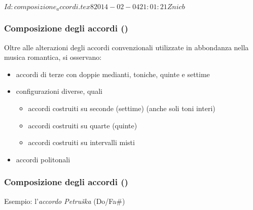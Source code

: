 %
%
\svnInfo $Id: composizione_accordi.tex 8 2014-02-04 21:01:21Z nicb $

\setcounter{ms}{0}
\begin{frame}
    \frametitle{Composizione degli accordi ()}
    
Oltre alle alterazioni degli accordi convenzionali
utilizzate in abbondanza nella musica romantica,
si osservano:

    \begin{itemize}

        \item accordi di terze con doppie medianti, toniche, quinte e settime

        \item configurazioni diverse, quali

            \begin{itemize}

                \item accordi costruiti su seconde (settime)
                    (anche soli toni interi)

                \item accordi costruiti su quarte (quinte)

                \item accordi costruiti su intervalli misti

            \end{itemize}

        \item accordi politonali

    \end{itemize}

\end{frame}

\begin{frame}
    \frametitle{Composizione degli accordi ()}
    
    Esempio: l'\emph{accordo Petru\v{s}ka} (Do/Fa\#)

    \begin{center}
    \begin{figure}
        \caption{}
    \end{figure}
    \end{center}

\end{frame}


